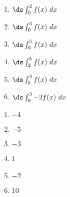 {\noindent
\begin{minipage}{\linewidth}
\end{minipage}
\begin{enumerate}
\item		$\ds \int_0^2 f(x)\ dx$
\item		$\ds \int_0^3 f(x)\ dx$
\item		$\ds \int_0^5 f(x)\ dx$
\item		$\ds \int_2^5 f(x)\ dx$
\item		$\ds \int_5^3 f(x)\ dx$
\item		$\ds \int_0^3 -2f(x)\ dx$
\end{enumerate}

}
{\begin{enumerate}
\item		$-4$
\item		$-5$
\item		$-3$
\item		1
\item		$-2$
\item		10
\end{enumerate}
}

